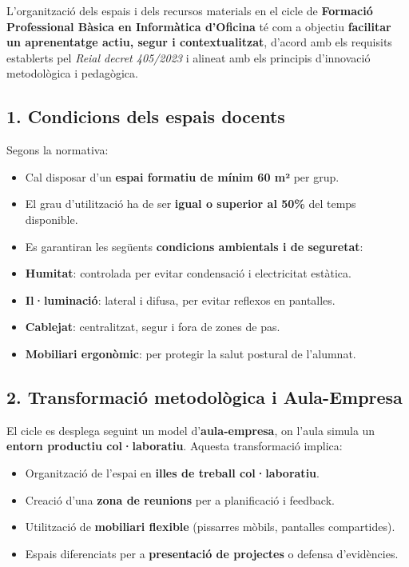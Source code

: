 \documentclass[
  paper=a4,
  ,captions=tableheading
]{scrartcl}
\providecommand{\tightlist}{%
  \setlength{\itemsep}{0pt}\setlength{\parskip}{0pt}}
\begin{document}
L'organització dels espais i dels recursos materials en el cicle de
\textbf{Formació Professional Bàsica en Informàtica d'Oficina} té com a
objectiu \textbf{facilitar un aprenentatge actiu, segur i
contextualitzat}, d'acord amb els requisits establerts pel \emph{Reial
decret 405/2023} i alineat amb els principis d'innovació metodològica i
pedagògica.

\hypertarget{condicions-dels-espais-docents}{%
\subsection{1. Condicions dels espais
docents}\label{condicions-dels-espais-docents}}

Segons la normativa:

\begin{itemize}
\tightlist
\item
  Cal disposar d'un \textbf{espai formatiu de mínim 60 m²} per grup.
\item
  El grau d'utilització ha de ser \textbf{igual o superior al 50\%} del
  temps disponible.
\item
  Es garantiran les següents \textbf{condicions ambientals i de
  seguretat}:
\item
  \textbf{Humitat}: controlada per evitar condensació i electricitat
  estàtica.
\item
  \textbf{Il·luminació}: lateral i difusa, per evitar reflexos en
  pantalles.
\item
  \textbf{Cablejat}: centralitzat, segur i fora de zones de pas.
\item
  \textbf{Mobiliari ergonòmic}: per protegir la salut postural de
  l'alumnat.
\end{itemize}

\hypertarget{transformaciuxf3-metodoluxf2gica-i-aula-empresa}{%
\subsection{2. Transformació metodològica i
Aula-Empresa}\label{transformaciuxf3-metodoluxf2gica-i-aula-empresa}}

El cicle es desplega seguint un model d'\textbf{aula-empresa}, on l'aula
simula un \textbf{entorn productiu col·laboratiu}. Aquesta transformació
implica:

\begin{itemize}
\tightlist
\item
  Organització de l'espai en \textbf{illes de treball col·laboratiu}.
\item
  Creació d'una \textbf{zona de reunions} per a planificació i feedback.
\item
  Utilització de \textbf{mobiliari flexible} (pissarres mòbils,
  pantalles compartides).
\item
  Espais diferenciats per a \textbf{presentació de projectes} o defensa
  d'evidències.
\end{itemize}
\end{document}
